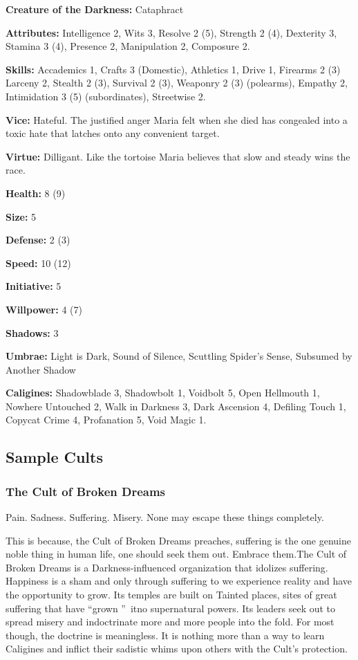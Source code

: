 \noindent \textbf{Creature of the Darkness:} Cataphract

\noindent \textbf{Attributes:} Intelligence 2, Wits 3, Resolve 2 (5), Strength 2 (4), Dexterity 3, Stamina 3 (4), Presence 2, Manipulation 2, Composure 2.

\noindent \textbf{Skills:} Accademics 1, Crafts 3 (Domestic), Athletics 1, Drive 1, Firearms 2 (3) Larceny 2, Stealth 2 (3), Survival 2 (3), Weaponry 2 (3) (polearms), Empathy 2, Intimidation 3 (5) (subordinates), Streetwise 2. 

\noindent \textbf{Vice:} Hateful. The justified anger Maria felt when she died has congealed into a toxic hate that latches onto any convenient target. 

\noindent \textbf{Virtue:} Dilligant. Like the tortoise Maria believes that slow and steady wins the race.

\noindent \textbf{Health:} 8 (9)

\noindent \textbf{Size:} 5

\noindent \textbf{Defense:} 2 (3)

\noindent \textbf{Speed:} 10 (12)

\noindent \textbf{Initiative:} 5

\noindent \textbf{Willpower:} 4 (7)

\noindent \textbf{Shadows:} 3

\noindent \textbf{Umbrae:} Light is Dark, Sound of Silence, Scuttling Spider's Sense, Subsumed by Another Shadow

\noindent \textbf{Caligines:} Shadowblade 3, Shadowbolt 1, Voidbolt 5, Open Hellmouth 1, Nowhere Untouched 2, Walk in Darkness 3, Dark Ascension 4, Defiling Touch 1, Copycat Crime 4, Profanation 5, Void Magic 1. 

\subsection*{Sample Cults}

\subsubsection*{The Cult of Broken Dreams}

Pain. Sadness. Suffering. Misery. None may escape these things completely. 

This is because, the Cult of Broken Dreams preaches, suffering is the one genuine noble thing in human life, one should seek them out. Embrace them.The Cult of Broken Dreams is a Darkness-influenced organization that idolizes suffering. Happiness is a sham and only through suffering to we experience reality and have the opportunity to grow. Its temples are built on Tainted places, sites of great suffering that have \textquotedblleft grown \textquotedblright\, itno supernatural powers. Its leaders seek out to spread misery and indoctrinate more and more people into the fold. For most though, the doctrine is meaningless. It is nothing more than a way to learn Caligines and inflict their sadistic whims upon others with the Cult's protection. 


